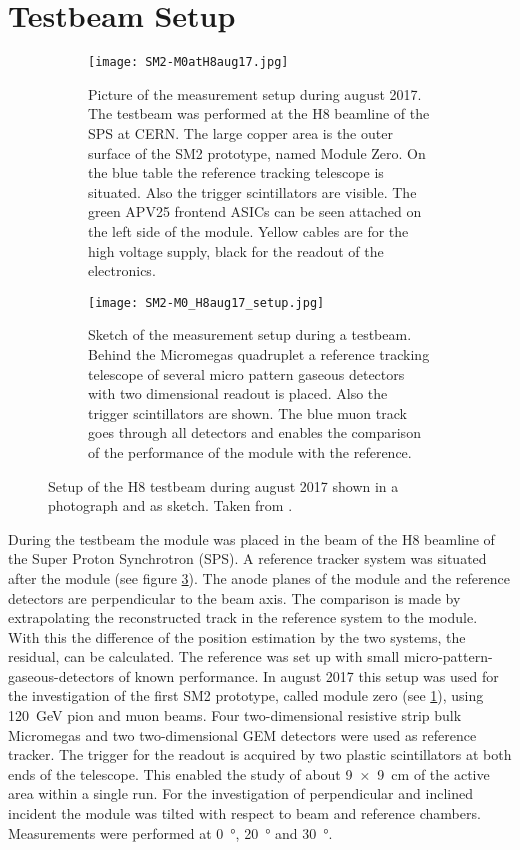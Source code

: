 \documentclass[
twoside,            %
BCOR1.4cm,          %
10pt,               %
headings=normal,    %
headsepline,        %
clearplainpage,		%
final,              %
div=14,
open=right,
bibliography=toc
]{scrreprt}
\begin{document}
\section{Testbeam Setup}

\begin{figure}[!h]
	\begin{subfigure}[b]{0.48\textwidth}
		\centering
		\texttt{[image: SM2-M0atH8aug17.jpg]}
		\caption{
			Picture of the measurement setup during august 2017. 
			The testbeam was performed at the H8 beamline of the SPS at CERN.
			The large copper area is the outer surface of the SM2 prototype, named Module Zero.
			On the blue table the reference tracking telescope is situated.
			Also the trigger scintillators are visible.
			The green APV25 frontend ASICs can be seen attached on the left side of the module.
			Yellow cables are for the high voltage supply, black for the readout of the electronics.
		}
		\label{H8setupPic} 
	\end{subfigure}
	\hfill
	\begin{subfigure}[b]{0.48\textwidth}
		\centering
		\texttt{[image: SM2-M0\_H8aug17\_setup.jpg]}
		\caption{
			Sketch of the measurement setup during a testbeam. 
			Behind the Micromegas quadruplet a reference tracking telescope of several micro pattern gaseous detectors with two dimensional readout is placed.
			Also the trigger scintillators are shown.
			The blue muon track goes through all detectors and enables the comparison of the performance of the module with the reference.
		}
		\label{H8setupSketch} 
	\end{subfigure}
	\vspace{-2mm}
	\caption{
		Setup of the H8 testbeam during august 2017 shown in a photograph and as sketch.
		Taken from \cite{flierlThesis}.
	}
\end{figure}

During the testbeam the module was placed in the beam of the H8 beamline of the Super Proton Synchrotron (SPS).
A reference tracker system was situated after the module (see figure \ref{H8setupSketch}).
The anode planes of the module and the reference detectors are perpendicular to the beam axis.
The comparison is made by extrapolating the reconstructed track in the reference system to the module. 
With this the difference of the position estimation by the two systems, the residual, can be calculated.
The reference was set up with small micro-pattern-gaseous-detectors of known performance.
In august 2017 this setup was used for the investigation of the first SM2 prototype, called module zero (see \ref{H8setupPic}), using \SI{120}{GeV} pion and muon beams.
Four two-dimensional resistive strip bulk Micromegas and two two-dimensional GEM detectors were used as reference tracker.
The trigger for the readout is acquired by two plastic scintillators at both ends of the telescope.
This enabled the study of about \SI[product-units = repeat]{9 x 9}{cm} of the active area within a single run.
For the investigation of perpendicular and inclined incident the module was tilted with respect to beam and reference chambers.
Measurements were performed at \SI{0}{\degree}, \SI{20}{\degree} and \SI{30}{\degree}.
\end{document}
